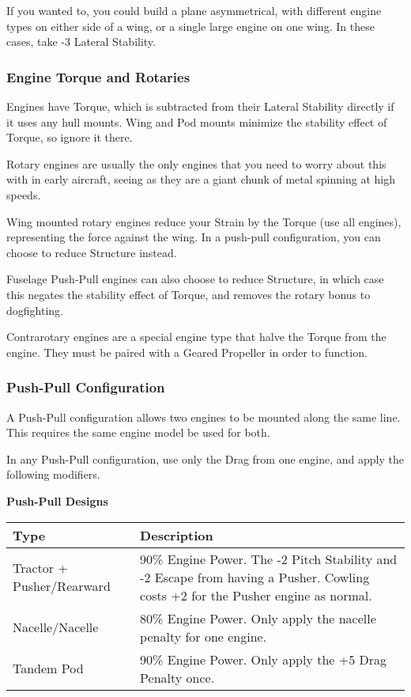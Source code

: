 \documentclass{article}
\begin{document}
If you wanted to, you could build a plane asymmetrical, with
different engine types on either side of a wing, or a single large
engine on one wing. In these cases, take -3 Lateral Stability.

\subsubsection{Engine Torque and Rotaries}
\label{_Engine Torque and Rotaries}

Engines have Torque, which is subtracted from their Lateral Stability
directly if it uses any hull mounts. Wing and Pod mounts minimize the
stability effect of Torque, so ignore it there.

Rotary engines are usually the only engines that you need to worry about
this with in early aircraft, seeing as they are a giant chunk of metal
spinning at high speeds.

Wing mounted rotary engines reduce your Strain by the Torque (use all
engines), representing the force against the wing. In a push-pull
configuration, you can choose to reduce Structure instead.

Fuselage Push-Pull engines can also choose to reduce Structure, in which
case this negates the stability effect of Torque, and removes the rotary
bonus to dogfighting.

Contrarotary engines are a special engine type that halve the Torque
from the engine. They must be paired with a Geared Propeller in order to
function.

\subsubsection{Push-Pull Configuration}
\label{_Push-Pull Configuration}

A Push-Pull configuration allows two engines to be mounted along the
same line. This requires the same engine model be used for both.

In any Push-Pull configuration, use only the Drag from one engine, and
apply the following modifiers.

\textbf{Push-Pull Designs}

\begin{tabular}{|l|l|}
  \hline
  Type                      & Description                                             \\\hline
  Tractor + Pusher/Rearward & 90\% Engine Power. The -2 Pitch Stability
  and -2 Escape from having a Pusher. Cowling costs +2 for the Pusher
  engine as normal.                                                                   \\\hline
  Nacelle/Nacelle           & 80\% Engine Power. Only apply the nacelle penalty for
  one engine.                                                                         \\\hline
  Tandem Pod                & 90\% Engine Power. Only apply the +5 Drag Penalty once. \\\hline
\end{tabular}
\end{document}
